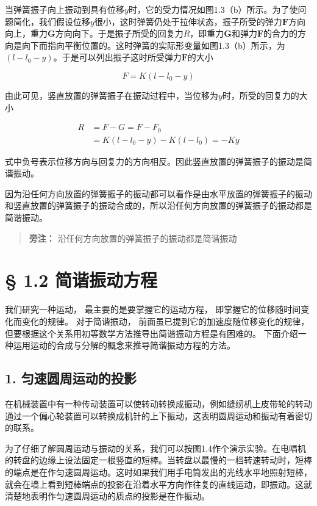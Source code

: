 当弹簧振子向上振动到具有位移\(y\)时，它的受力情况如图1.3（b）所示。为了使问题简化，我们假设位移\(y\)很小，这时弹簧仍处于拉伸状态，振子所受的弹力\(\pmb{F}\)方向向上，重力\(\pmb{G}\)方向向下。于是振子所受的回复力\(R\)，即重力\(\pmb{G}\)和弹力\(\pmb{F}\)的合力的方向是向下而指向平衡位置的。这时弹簧的实际形变量如图1.3（b）所示，为\((l - l_0 - y)\)。于是可以列出振子这时所受弹力\(\pmb{F}\)的大小

\[
F = K (l - l _ {0} - y)
\]

由此可见，竖直放置的弹簧振子在振动过程中，当位移为\(y\)时，所受的回复力的大小

\[
\begin{aligned} R &= F-G = F-F_0 \\ &= K(l-l_0-y)-K(l-l_0) = -Ky \end{aligned}
\]

式中负号表示位移方向与回复力的方向相反。因此竖直放置的弹簧振子的振动是简谐振动。

因为沿任何方向放置的弹簧振子的振动都可以看作是由水平放置的弹簧振子的振动和竖直放置的弹簧振子的振动合成的，所以沿任何方向放置的弹簧振子的振动都是简谐振动。

\begin{quote}
\textbf{旁注：} 沿任何方向放置的弹簧振子的振动都是简谐振动
\end{quote}

\section{§ 1.2 简谐振动方程}\label{ux7b80ux8c10ux632fux52a8ux65b9ux7a0b}

我们研究一种运动， 最主要的是要掌握它的运动方程，
即掌握它的位移随时间变化而变化的规律。 对于简谐振动，
前面虽已提到它的加速度随位移变化的规律，
但要根据这个关系用初等数学方法推导出简谐振动方程是有困难的。
下面介绍一种运用运动的合成与分解的概念来推导简谐振动方程的方法。

\subsection{1.
匀速圆周运动的投影}\label{ux5300ux901fux5706ux5468ux8fd0ux52a8ux7684ux6295ux5f71}

在机械装置中有一种传动装置可以使转动转换成振动，例如缝纫机上皮带轮的转动通过一个偏心轮装置可以转换成机针的上下振动，这表明圆周运动和振动有着密切的联系。

为了仔细了解圆周运动与振动的关系，我们可以按图1.4作个演示实验。在电唱机的转盘的边缘上设法固定一根竖直的短棒。当转盘以最慢的一档转速转动时，短棒的端点是在作匀速圆周运动。这时如果我们用手电筒发出的光线水平地照射短棒，就会在墙上看到短棒端点的投影在沿着水平方向作往复的直线运动，即振动。这就清楚地表明作匀速圆周运动的质点的投影是在作振动。

